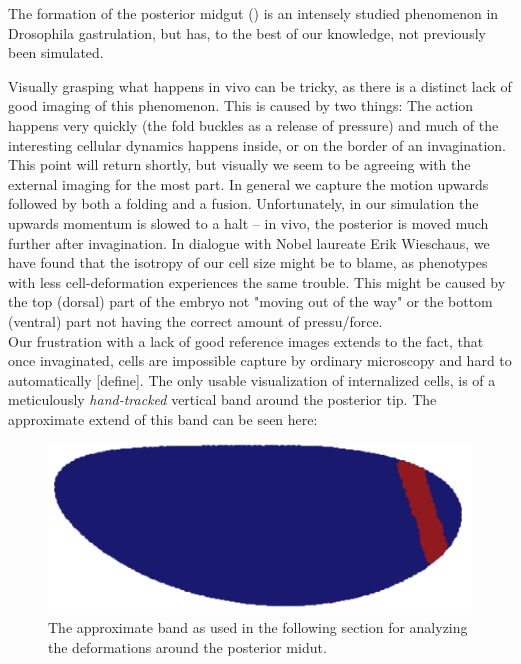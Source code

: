 The formation of the posterior midgut () is an intensely studied phenomenon in Drosophila gastrulation, but has, to the best of our knowledge, not previously been simulated.

Visually grasping what happens in vivo can be tricky, as there is a distinct lack of good imaging of this phenomenon. This is caused by two things: The action happens very quickly (the fold buckles as a release of pressure) and much of the interesting cellular dynamics happens inside, or on the border of an invagination. This point will return shortly, but visually we seem to be agreeing with the external imaging for the most part. In general we capture the motion upwards followed by both a folding and a fusion. Unfortunately, in our simulation the upwards momentum is slowed to a halt -- in vivo, the posterior is moved much further after invagination. In dialogue with Nobel laureate Erik Wieschaus, we have found that the isotropy of our cell size might be to blame, as phenotypes with less cell-deformation experiences the same trouble. This might be caused by the top (dorsal) part of the embryo not "moving out of the way" or the bottom (ventral) part not having the correct amount of pressu/force.\\

Our frustration with a lack of good reference images extends to the fact, that once invaginated, cells are impossible capture by ordinary microscopy and hard to automatically [define]. The only usable visualization of internalized cells, is of a meticulously \textit{hand-tracked} vertical band around the posterior tip. The approximate extend of this band can be seen here:
\begin{figure}[H]
    \centering
    \includegraphics[width=0.5\linewidth]{chapters//Results//figures/daniel_band_pos.png}
    \caption{The approximate band as used in the following section for analyzing the deformations around the posterior midut.}
\end{figure}

